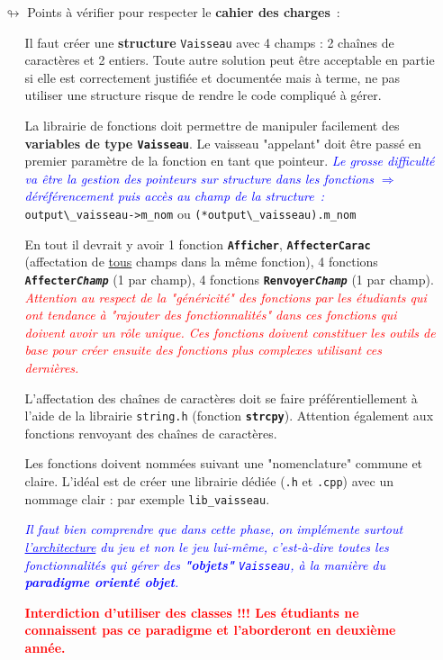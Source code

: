 \documentclass[10pt, fleqn, a4paper]{article}
\newcommand{\bfcolor}[2]{\textcolor{#1}{\textbf{#2}}}
\newcommand{\itcolor}[2]{\textcolor{#1}{\textit{#2}}}
\begin{document}
\begin{itemize}
\item[$\looparrowright$] Points à vérifier pour respecter le \textbf{cahier des charges}~:
\begin{itemize}
\item[\ding{223}] Il faut créer une \textbf{structure} \texttt{Vaisseau} avec 4 champs : 2 chaînes de caractères et 2 entiers. Toute autre solution peut être acceptable en partie si elle est correctement justifiée et documentée mais à terme, ne pas utiliser une structure risque de rendre le code compliqué à gérer.
\item[\ding{223}] La librairie de fonctions doit permettre de manipuler facilement des \textbf{variables de type \texttt{Vaisseau}}. Le vaisseau "appelant" doit être passé en premier paramètre de la fonction en tant que pointeur. \itcolor{blue}{Le grosse difficulté va être la gestion des pointeurs sur structure dans les fonctions $\Rightarrow$ déréférencement puis accès au champ de la structure~:}
\verb!output\_vaisseau->m_nom! ou \verb!(*output\_vaisseau).m_nom!
\item[\ding{223}] En tout il devrait y avoir 1 fonction \texttt{\bf Afficher}, \texttt{\bf AffecterCarac} (affectation de \underline{tous} champs dans la même fonction), 4 fonctions \texttt{\bf Affecter\textit{Champ}} (1 par champ), 4 fonctions \texttt{\bf Renvoyer\textit{Champ}} (1 par champ). \itcolor{red}{Attention au respect de la "généricité" des fonctions par les étudiants qui ont tendance à "rajouter des fonctionnalités" dans ces fonctions qui doivent avoir un rôle unique. Ces fonctions doivent constituer les outils de base pour créer ensuite des fonctions plus complexes utilisant ces dernières.}
\item[\ding{223}] L'affectation des chaînes de caractères doit se faire préférentiellement à l'aide de la librairie \texttt{string.h} (fonction \texttt{\bf strcpy}). Attention également aux fonctions renvoyant des chaînes de caractères.
\item[\ding{223}] Les fonctions doivent nommées suivant une "nomenclature" commune et claire. L'idéal est de créer une librairie dédiée (\texttt{.h} et \texttt{.cpp}) avec un nommage clair : par exemple \texttt{lib\_vaisseau}.
\item[\ding{223}] \itcolor{blue}{Il faut bien comprendre que dans cette phase, on implémente surtout \underline{l'architecture} du jeu et non le jeu lui-même, c'est-à-dire toutes les fonctionnalités qui gérer des \textbf{"objets"} \texttt{Vaisseau}, à la manière du \textbf{paradigme orienté objet}.}
\item[\ding{223}] \bfcolor{red}{Interdiction d'utiliser des classes !!! Les étudiants ne connaissent pas ce paradigme et l'aborderont en deuxième année.}
\end{itemize}
\end{itemize}
\end{document}
